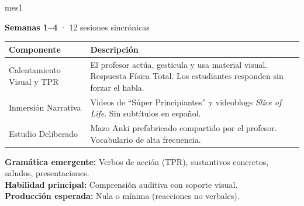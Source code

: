 \documentclass[12pt,a4paper]{article}
\begin{document}
\begin{cajames}[\textcolor{white}{Mes 1: El Periodo Silencioso y Adquisición Fonológica (A0 $\rightarrow$ A1)}]{mes1}

\textbf{Semanas 1--4} · 12 sesiones sincrónicas

\medskip
\begin{tabularx}{\textwidth}{@{} l X @{}}
\toprule
\textbf{Componente} & \textbf{Descripción} \\
\midrule
Calentamiento Visual y TPR & El profesor actúa, gesticula y usa material visual. Respuesta Física Total. Los estudiantes responden sin forzar el habla. \\[4pt]
Inmersión Narrativa & Videos de ``Súper Principiantes'' y videoblogs \textit{Slice of Life}. Sin subtítulos en español. \\[4pt]
Estudio Deliberado & Mazo Anki prefabricado compartido por el profesor. Vocabulario de alta frecuencia. \\
\bottomrule
\end{tabularx}

\medskip
\textbf{Gramática emergente:} Verbos de acción (TPR), sustantivos concretos, saludos, presentaciones.\\
\textbf{Habilidad principal:} Comprensión auditiva con soporte visual.\\
\textbf{Producción esperada:} Nula o mínima (reacciones no verbales).
\end{cajames}

\vspace{0.3cm}
\end{document}
